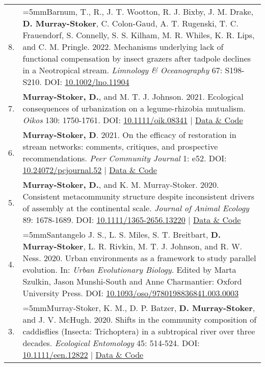 \documentclass[letterpaper,11pt,oneside]{article}
\begin{document}
\def\arraystretch{1.4}
\noindent
\begin{longtable}{@{} p{0.5cm} >{\raggedright\arraybackslash}p{16.7cm}}
8. & \hangindent=5mmBarnum, T., R., J. T. Wootton, R. J. Bixby, J. M. Drake, \textbf{D. Murray-Stoker}, C. Colon-Gaud, A. T. Rugenski, T. C. Frauendorf, S. Connelly, S. S. Kilham, M. R. Whiles, K. R. Lips, and C. M. Pringle. 2022. Mechanisms underlying lack of functional compensation by insect grazers after tadpole declines in a Neotropical stream. \textit{Limnology \& Oceanography} 67: S198-S210. DOI: {\href{https://aslopubs.onlinelibrary.wiley.com/doi/full/10.1002/lno.11904}{10.1002/lno.11904}} \\
7. & \hangindent=5mm\textbf{Murray-Stoker, D.}, and M. T. J. Johnson. 2021. Ecological consequences of urbanization on a legume-rhizobia mutualism. \textit{Oikos} 130: 1750-1761. DOI: {\href{https://onlinelibrary.wiley.com/doi/full/10.1111/oik.08341}{10.1111/oik.08341}} | {\href{https://zenodo.org/record/4459724#.YmVqvfPMIbl}{Data \& Code}} \\
6. & \hangindent=5mm\textbf{Murray-Stoker, D}. 2021. On the efficacy of restoration in stream networks: comments, critiques, and prospective recommendations. \textit{Peer Community Journal} 1: e52. DOI: {\href{https://peercommunityjournal.org/articles/10.24072/pcjournal.52/}{10.24072/pcjournal.52}} | {\href{https://figshare.com/articles/dataset/On_the_relativity_and_efficacy_of_restoration_in_stream_networks_comment/6448010}{Data \& Code}} \\
5. & \hangindent=5mm\textbf{Murray-Stoker, D.}, and K. M. Murray-Stoker. 2020. Consistent metacommunity structure despite inconsistent drivers of assembly at the continental scale. \textit{Journal of Animal Ecology} 89: 1678-1689. DOI: {\href{http://besjournals.onlinelibrary.wiley.com/doi/abs/10.1111/1365-2656.13220}{10.1111/1365-2656.13220}} | {\href{https://osf.io/62je8/}{Data \& Code}} \\
4. & \hangindent=5mmSantangelo J. S., L. S. Miles, S. T. Breitbart, \textbf{D. Murray-Stoker}, L. R. Rivkin, M. T. J. Johnson, and R. W. Ness. 2020. Urban environments as a framework to study parallel evolution. In: \textit{Urban Evolutionary Biology}. Edited by Marta Szulkin, Jason Munshi-South and Anne Charmantier: Oxford University Press. DOI: {\href{https://oxford.universitypressscholarship.com/view/10.1093/oso/9780198836841.001.0001/oso-9780198836841-chapter-3}{10.1093/oso/9780198836841.003.0003}} \\
3. & \hangindent=5mmMurray-Stoker, K. M., D. P. Batzer, \textbf{D. Murray-Stoker}, and J. V. McHugh. 2020. Shifts in the community composition of caddisflies (Insecta: Trichoptera) in a subtropical river over three decades. \textit{Ecological Entomology} 45: 514-524. DOI: {\href{https://resjournals.onlinelibrary.wiley.com/doi/full/10.1111/een.12822}{10.1111/een.12822}} | {\href{https://figshare.com/articles/dataset/Shifts_in_the_community_composition_of_caddisflies_Insecta_Trichoptera_in_a_subtropical_river_over_three_decades/14237687}{Data \& Code}} \\

\end{longtable}
\end{document}
